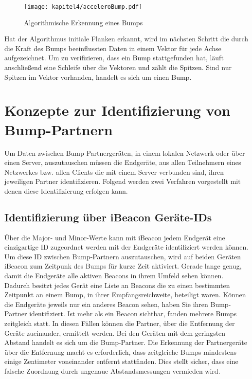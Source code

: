 \begin{figure}[H]
    \centering
    \texttt{[image: kapitel4/acceleroBump.pdf]}
    \caption{Algorithmische Erkennung eines Bumps}
    \label{fig:bump}
\end{figure}

Hat der Algorithmus initiale Flanken erkannt, wird im nächsten Schritt die durch die Kraft des Bumps beeinflussten Daten in einem Vektor für jede Achse aufgezeichnet. Um zu verifizieren, dass ein Bump stattgefunden hat, läuft anschließend eine Schleife über die Vektoren und zählt die Spitzen. Sind nur Spitzen im Vektor vorhanden, handelt es sich um einen Bump.

\newpage
\section{Konzepte zur Identifizierung von Bump-Partnern}
\label{sec:Ident}
Um Daten zwischen Bump-Partnergeräten, in einem lokalen Netzwerk oder über einen Server, auszutauschen müssen die Endgeräte, aus allen Teilnehmern eines Netzwerkes bzw. allen Clients die mit einem Server verbunden sind, ihren jeweiligen Partner identifizieren. Folgend werden zwei Verfahren vorgestellt mit denen diese Identifizierung erfolgen kann.

\subsection{Identifizierung über iBeacon Geräte-IDs}
Über die Major- und Minor-Werte kann mit iBeacon jedem Endgerät eine einzigartige ID zugeordnet werden mit der Endgeräte identifiziert werden können. Um diese ID zwischen Bump-Partnern auszutauschen, wird auf beiden Geräten iBeacon zum Zeitpunk des Bumps für kurze Zeit aktiviert. Gerade lange genug, damit die Endgeräte alle aktiven Beacons in ihrem Umfeld sehen können. Dadurch besitzt jedes Gerät eine Liste an Beacons die zu einen bestimmten Zeitpunkt an einem Bump, in ihrer Empfangsreichweite, beteiligt waren. Können die Endgeräte jeweils nur ein anderes Beacon sehen, haben Sie ihren Bump-Partner identifiziert. Ist mehr als ein Beacon sichtbar, fanden mehrere Bumps zeitgleich statt. In diesen Fällen können die Partner, über die Entfernung der Geräte zueinander, ermittelt werden. Bei den Geräten mit dem geringsten Abstand handelt es sich um die Bump-Partner. Die Erkennung der Partnergeräte über die Entfernung macht es erforderlich, dass zeitgleiche Bumps mindestens einige Zentimeter voneinander entfernt stattfinden. Dies stellt sicher, dass eine falsche Zuordnung durch ungenaue Abstandsmessungen vermieden wird.

